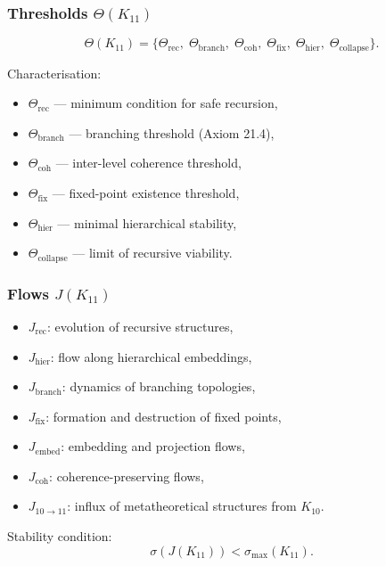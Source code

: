 \subsubsection{Thresholds $\Theta(K_{11})$}

\[
\Theta(K_{11})=
\{
\Theta_{\mathrm{rec}},\;
\Theta_{\mathrm{branch}},\;
\Theta_{\mathrm{coh}},\;
\Theta_{\mathrm{fix}},\;
\Theta_{\mathrm{hier}},\;
\Theta_{\mathrm{collapse}}
\}.
\]

Characterisation:
\begin{itemize}
    \item $\Theta_{\mathrm{rec}}$ — minimum condition for safe recursion,
    \item $\Theta_{\mathrm{branch}}$ — branching threshold (Axiom 21.4),
    \item $\Theta_{\mathrm{coh}}$ — inter-level coherence threshold,
    \item $\Theta_{\mathrm{fix}}$ — fixed-point existence threshold,
    \item $\Theta_{\mathrm{hier}}$ — minimal hierarchical stability,
    \item $\Theta_{\mathrm{collapse}}$ — limit of recursive viability.
\end{itemize}

\subsubsection{Flows $J(K_{11})$}

\begin{itemize}
    \item $J_{\mathrm{rec}}$: evolution of recursive structures,
    \item $J_{\mathrm{hier}}$: flow along hierarchical embeddings,
    \item $J_{\mathrm{branch}}$: dynamics of branching topologies,
    \item $J_{\mathrm{fix}}$: formation and destruction of fixed points,
    \item $J_{\mathrm{embed}}$: embedding and projection flows,
    \item $J_{\mathrm{coh}}$: coherence-preserving flows,
    \item $J_{10\to11}$: influx of metatheoretical structures from $K_{10}$.
\end{itemize}

Stability condition:
\[
\sigma(J(K_{11})) < \sigma_{\max}(K_{11}).
\]

